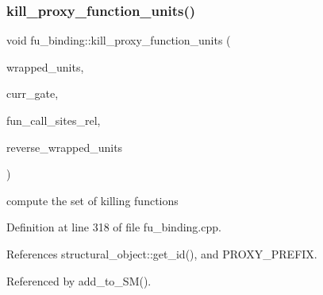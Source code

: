 \subsubsection{\texorpdfstring{kill\+\_\+proxy\+\_\+function\+\_\+units()}{kill\_proxy\_function\_units()}}
{\footnotesize\ttfamily void fu\+\_\+binding\+::kill\+\_\+proxy\+\_\+function\+\_\+units (\begin{DoxyParamCaption}\item[{std\+::map$<$ unsigned int, std\+::string $>$ \&}]{wrapped\+\_\+units,  }\item[{\hyperlink{structural__objects_8hpp_a8ea5f8cc50ab8f4c31e2751074ff60b2}{structural\+\_\+object\+Ref}}]{curr\+\_\+gate,  }\item[{std\+::map$<$ std\+::string, std\+::list$<$ \hyperlink{structural__objects_8hpp_a8ea5f8cc50ab8f4c31e2751074ff60b2}{structural\+\_\+object\+Ref} $>$$>$ \&}]{fun\+\_\+call\+\_\+sites\+\_\+rel,  }\item[{std\+::map$<$ std\+::string, unsigned int $>$ \&}]{reverse\+\_\+wrapped\+\_\+units }\end{DoxyParamCaption})\hspace{0.3cm}{\ttfamily [protected]}}

compute the set of killing functions 

Definition at line 318 of file fu\+\_\+binding.\+cpp.



References structural\+\_\+object\+::get\+\_\+id(), and P\+R\+O\+X\+Y\+\_\+\+P\+R\+E\+F\+IX.



Referenced by add\+\_\+to\+\_\+\+S\+M().

